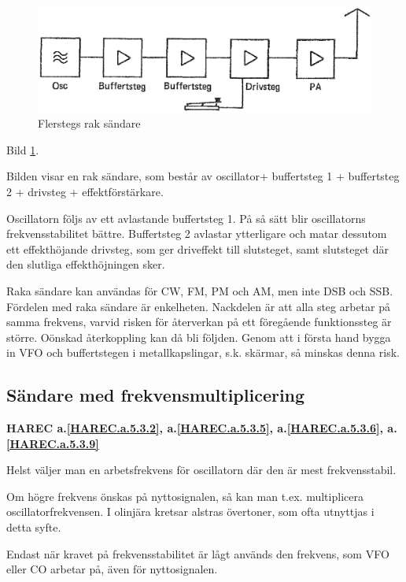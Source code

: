 \begin{figure}
  \includegraphics[width=\textwidth]{images/cropped_pdfs/bild_2_5-02.pdf}
  \caption{Flerstegs rak sändare}
  \label{fig:bildII5-2}
\end{figure}

Bild \ref{fig:bildII5-2}.

Bilden visar en rak sändare, som består av oscillator+ buffertsteg 1 +
buffertsteg 2 + drivsteg + effektförstärkare.

Oscillatorn följs av ett avlastande buffertsteg 1. På så sätt blir
oscillatorns frekvensstabilitet bättre. Buffertsteg 2 avlastar
ytterligare och matar dessutom ett effekthöjande drivsteg, som ger
driveffekt till slutsteget, samt slutsteget där den slutliga
effekthöjningen sker.

Raka sändare kan användas för CW, FM, PM och AM, men inte DSB och SSB.
Fördelen med raka sändare är enkelheten.  Nackdelen är att alla steg
arbetar på samma frekvens, varvid risken för återverkan på ett
föregående funktionssteg är större. Oönskad återkoppling kan då bli
följden. Genom att i första hand bygga in VFO och buffertstegen i
metallkapslingar, s.k. skärmar, så minskas denna risk.

\subsection{Sändare med frekvensmultiplicering}
\textbf{
HAREC a.\ref{HAREC.a.5.3.2}\label{myHAREC.a.5.3.2},
 a.\ref{HAREC.a.5.3.5}\label{myHAREC.a.5.3.5},
 a.\ref{HAREC.a.5.3.6}\label{myHAREC.a.5.3.6},
 a.\ref{HAREC.a.5.3.9}\label{myHAREC.a.5.3.9}
}

Helst väljer man en arbetsfrekvens för oscillatorn där den är mest
frekvensstabil.

Om högre frekvens önskas på nyttosignalen, så kan man
t.ex. multiplicera oscillatorfrekvensen. I olinjära kretsar alstras
övertoner, som ofta utnyttjas i detta syfte.

Endast när kravet på frekvensstabilitet är lågt används den frekvens,
som VFO eller CO arbetar på, även för nyttosignalen.

